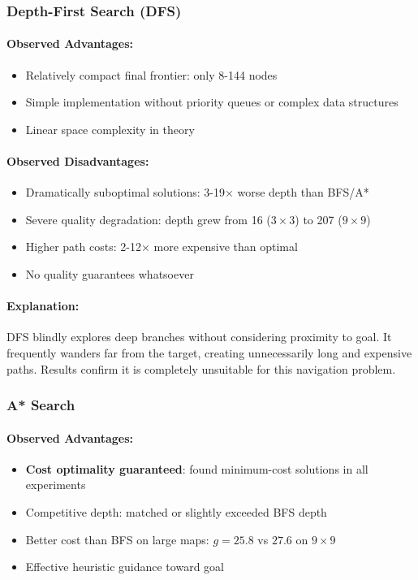 \documentclass[11pt,a4paper]{article}
\begin{document}
\subsubsection{Depth-First Search (DFS)}

\paragraph{Observed Advantages:}
\begin{itemize}[leftmargin=1.5cm,itemsep=0.1em]
    \item Relatively compact final frontier: only 8-144 nodes
    \item Simple implementation without priority queues or complex data structures
    \item Linear space complexity in theory
\end{itemize}

\paragraph{Observed Disadvantages:}
\begin{itemize}[leftmargin=1.5cm,itemsep=0.1em]
    \item Dramatically suboptimal solutions: 3-19× worse depth than BFS/A*
    \item Severe quality degradation: depth grew from 16 ($3\times3$) to 207 ($9\times9$)
    \item Higher path costs: 2-12× more expensive than optimal
    \item No quality guarantees whatsoever
\end{itemize}

\paragraph{Explanation:}
DFS blindly explores deep branches without considering proximity to goal. It frequently wanders far from the target, creating unnecessarily long and expensive paths. Results confirm it is completely unsuitable for this navigation problem.

\subsubsection{A* Search}

\paragraph{Observed Advantages:}
\begin{itemize}[leftmargin=1.5cm,itemsep=0.1em]
    \item \textbf{Cost optimality guaranteed}: found minimum-cost solutions in all experiments
    \item Competitive depth: matched or slightly exceeded BFS depth
    \item Better cost than BFS on large maps: $g=25.8$ vs $27.6$ on $9\times9$
    \item Effective heuristic guidance toward goal
\end{itemize}
\end{document}
